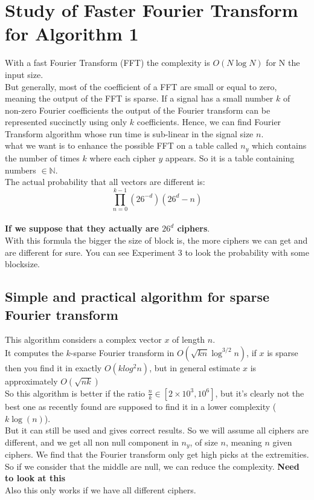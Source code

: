 \documentclass{article}
\begin{document}
\section{Study of Faster Fourier Transform for Algorithm 1}
With a fast Fourier Transform (FFT) the complexity is $O(N\log N)$ for N the input size.\\
But generally, most of the coefficient of a FFT are small or equal to zero, meaning the output of the FFT is sparse. If a signal has a small number $k$ of non-zero Fourier coefficients the output of the Fourier transform can be represented succinctly using only $k$ coefficients. Hence, we can find Fourier Transform algorithm whose run time is sub-linear in the signal size $n$.\\
what we want is to enhance the possible FFT on a table called $n_y$ which contains the number of times $k$ where each cipher $y$ appears. So it is a table containing numbers $\in \mathbb{N}$.\\
The actual probability that all vectors are different is:
$$\prod_{n=0}^{k-1}{(26^{-d})(26^d -n)}$$\\
\textbf{If we suppose that they actually are $26^d$ ciphers}.\\
With this formula the bigger the size of block is, the more ciphers we can get and are different for sure. You can see Experiment 3 to look the probability with some blocksize.\\

\subsection{Simple and practical algorithm for sparse Fourier transform}
This algorithm considers a complex vector $x$ of length $n$.\\
It computes the $k$-sparse Fourier transform in $O(\sqrt{kn}\log^{3/2}n)$, if $x$ is sparse then you find it in exactly $O(klog^{2}n)$, but in general estimate $x$ is approximately $O(\sqrt{nk})$\\
So this algorithm is better if the ratio $\frac{n}{k} \in [2 \times 10^3, 10^6]$, but it's clearly not the best one as recently found are supposed to find it in a lower complexity ($k\log(n)$).\\
But it can still be used and gives correct results.
So we will assume all ciphers are different, and we get all non null component in $n_y$, of size $n$, meaning $n$ given ciphers. We find that the Fourier transform only get high picks at the extremities.\\
So if we consider that the middle are null, we can reduce the complexity. \textbf{Need to look at this}\\
Also this only works if we have all different ciphers.
\end{document}
